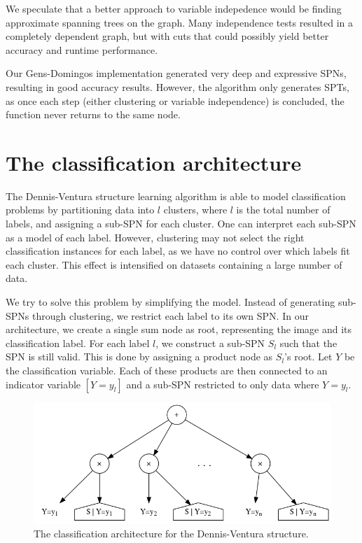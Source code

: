 We speculate that a better approach to variable indepedence would be finding approximate spanning
trees on the graph. Many independence tests resulted in a completely dependent graph, but with
cuts that could possibly yield better accuracy and runtime performance.

Our Gens-Domingos implementation generated very deep and expressive SPNs, resulting in good
accuracy results. However, the algorithm only generates SPTs, as once each step (either clustering
or variable independence) is concluded, the function never returns to the same node.

\section{The classification architecture}

The Dennis-Ventura structure learning algorithm is able to model classification problems by
partitioning data into $l$ clusters, where $l$ is the total number of labels, and assigning a
sub-SPN for each cluster. One can interpret each sub-SPN as a model of each label. However,
clustering may not select the right classification instances for each label, as we have no control
over which labels fit each cluster. This effect is intensified on datasets containing a large
number of data.

We try to solve this problem by simplifying the model. Instead of generating sub-SPNs through
clustering, we restrict each label to its own SPN\@. In our architecture, we create a single sum
node as root, representing the image and its classification label. For each label $l$, we construct
a sub-SPN $S_l$ such that the SPN is still valid. This is done by assigning a product node as
$S_l$'s root. Let $Y$ be the classification variable. Each of these products are then connected to
an indicator variable $[Y=y_l]$ and a sub-SPN restricted to only data where $Y=y_l$.

\begin{figure}[h]
  \centering\includegraphics[scale=0.5]{graphs/classarch.png}
  \caption{The classification architecture for the Dennis-Ventura structure.\label{fig:class_arch}}
\end{figure}

